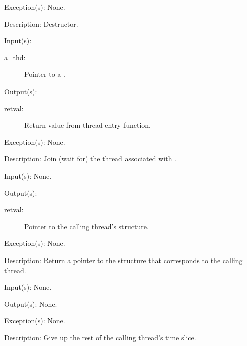 \begin{capi}
\begin{capilist}
	\item[Exception(s): ] None.
	\item[Description: ]
		Destructor.
	\end{capilist}
\label{thd_join}
	\begin{capilist}
	\item[Input(s): ]
		\begin{description}\item[]
		\item[a\_thd: ] Pointer to a .
		\end{description}
	\item[Output(s): ]
		\begin{description}\item[]
		\item[retval: ]
			Return value from thread entry function.
		\end{description}
	\item[Exception(s): ] None.
	\item[Description: ]
		Join (wait for) the thread associated with .
	\end{capilist}
\label{thd_self}
	\begin{capilist}
	\item[Input(s): ] None.
	\item[Output(s): ]
		\begin{description}\item[]
		\item[retval: ]
			Pointer to the calling thread's \classname{thd}
			structure.
		\end{description}
	\item[Exception(s): ] None.
	\item[Description: ]
		Return a pointer to the  structure that
		corresponds to the calling thread.
	\end{capilist}
\label{thd_yield}
	\begin{capilist}
	\item[Input(s): ] None.
	\item[Output(s): ] None.
	\item[Exception(s): ] None.
	\item[Description: ]
		Give up the rest of the calling thread's time slice.
	\end{capilist}

\end{capi}

